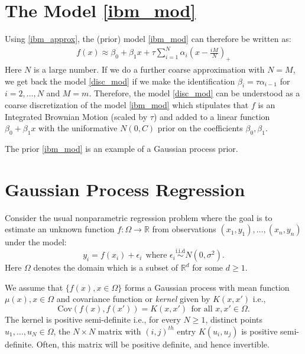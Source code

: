 \documentclass{scrartcl}
\newcommand{\R}{{\mathbb R}}
\begin{document}
\section{The Model \eqref{ibm_mod}}
Using \eqref{ibm_approx}, the (prior) model \eqref{ibm_mod} can
therefore be written as:
\begin{align*}
  f(x) \approx \beta_0 + \beta_1 x + \tau \sum_{i=1}^N \alpha_i
  \left(x - \frac{iM}{N}\right)_+  
\end{align*}
Here $N$ is a large number. If we do a further coarse approximation
with $N = M$, we get back the model \eqref{disc_mod} if we make the
identification $\beta_i = \tau \alpha_{i-1}$ for $i = 2, \dots, N$ and $M =
m$. Therefore, the model \eqref{disc_mod} can be understood as a
coarse discretization of the model \eqref{ibm_mod} which stipulates
that $f$ is an Integrated Brownian Motion (scaled by $\tau$) and added
to a linear function $\beta_0 + \beta_1 x$ with the uniformative $N(0,
C)$ prior on the coefficients $\beta_0, \beta_1$.

The prior \eqref{ibm_mod} is an example of a Gaussian process prior. 

\section{Gaussian Process Regression}
Consider the usual nonparametric regression problem where the goal is
to estimate an unknown function $f : \Omega \rightarrow \R$ from
observations $(x_1, y_1), \dots, (x_n, y_n)$ under the model:
\begin{equation*}
  y_i = f(x_i) + \epsilon_i ~~\text{where $\epsilon_i
    \overset{\text{i.i.d}}{\sim} N(0, \sigma^2)$}. 
\end{equation*}
Here $\Omega$ denotes the domain which is a subset of $\R^d$ for some
$d \geq 1$. 

We assume that $\{f(x), x \in
\Omega\}$ forms a Gaussian process with mean function $\mu(x), x \in
\Omega$ and covariance 
function or \textit{kernel} given by $K(x, x')$ i.e.,
\begin{equation*}
  \text{Cov}(f(x), f(x')) = K(x, x') ~~\text{for all $x, x' \in
    \Omega$}. 
\end{equation*}
The kernel is positive semi-definite i.e., for every $N \geq 1$,
distinct points $u_1, \dots, u_N \in \Omega$, the $N \times N$
matrix with $(i, j)^{th}$ entry $K(u_i, u_j)$ is positive
semi-definite. Often, this matrix will be positive definite, and hence
invertible.
\end{document}

